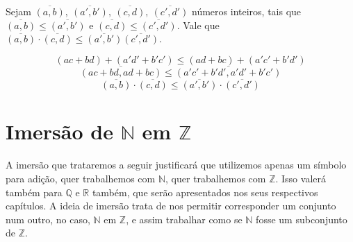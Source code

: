 \documentclass[../main.tex]{subfiles}
\begin{document}
\begin{prop}\label{int-prop-produtoMaiores}
    Sejam $\overline{(a,b)},\ \overline{(a',b')},\ \overline{(c,d)},\ \overline{(c',d')}$ números inteiros, tais que $\overline{(a,b)} \leq \overline{(a',b')}$ e $\overline{(c,d)} \leq \overline{(c',d')}$. Vale que $\overline{(a,b)} \cdot \overline{(c,d)} \leq \overline{(a',b')}
    \overline{(c',d')}$.
\end{prop}
\begin{dem}
    \[ (ac+bd) + (a'd'+b'c') \leq (ad+bc) + (a'c' + b'd') \]
    \[ \overline{(ac+bd, ad+bc)} \leq \overline{(a'c'+b'd', a'd'+b'c')} \]
    \[ \overline{(a,b)} \cdot \overline{(c,d)} \leq \overline{(a',b')} \cdot \overline{(c',d')}  \]
\end{dem}

\section{Imersão de $\mathbb{N}$ em $\mathbb{Z}$}
A imersão que trataremos a seguir justificará que utilizemos apenas um símbolo para adição, quer trabalhemos com $\mathbb{N}$, quer trabalhemos com $\mathbb{Z}$. Isso valerá também para $\mathbb{Q}$ e $\mathbb{R}$ também, que serão apresentados nos seus respectivos capítulos. A ideia de imersão trata de nos permitir corresponder um conjunto num outro, no caso, $\mathbb{N}$ em $\mathbb{Z}$, e assim trabalhar como se $\mathbb{N}$ fosse um subconjunto de $\mathbb{Z}$.
\end{document}
